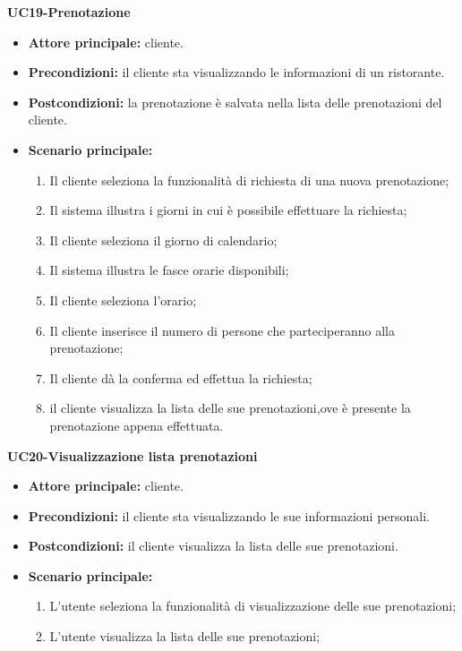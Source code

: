 \textbf{UC19-Prenotazione}
\begin{itemize}
    \item \textbf{Attore principale: }cliente.
    \item \textbf{Precondizioni: }il cliente sta visualizzando le informazioni di un ristorante.
    \item \textbf{Postcondizioni: }la prenotazione è salvata nella lista delle prenotazioni del cliente.
    \item \textbf{Scenario principale:} 
        \begin{enumerate}
            \item Il cliente seleziona la funzionalità di richiesta di una nuova prenotazione;
            \item Il sistema illustra i giorni in cui è possibile effettuare la richiesta;
            \item Il cliente seleziona il giorno di calendario;
            \item Il sistema illustra le fasce orarie disponibili;
            \item Il cliente seleziona l'orario;
            \item Il cliente inserisce il numero di persone che parteciperanno alla prenotazione;
            \item Il cliente dà la conferma ed effettua la richiesta;
            \item il cliente visualizza la lista delle sue prenotazioni,ove è presente la prenotazione appena
            effettuata.
        \end{enumerate}
\end{itemize}

\textbf{UC20-Visualizzazione lista prenotazioni}
\begin{itemize}
    \item \textbf{Attore principale: } cliente.
    \item \textbf{Precondizioni: }il cliente sta visualizzando le sue informazioni personali.
    \item \textbf{Postcondizioni: }il cliente visualizza la lista delle sue prenotazioni.
    \item \textbf{Scenario principale:} 
        \begin{enumerate}
            \item L'utente seleziona la funzionalità di visualizzazione delle sue prenotazioni;
            
            \item L'utente visualizza la lista delle sue prenotazioni;
        \end{enumerate}
\end{itemize}

